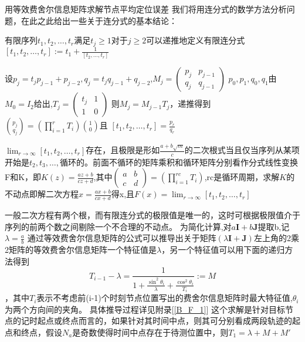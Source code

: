 {用等效费舍尔信息矩阵求解节点平均定位误差}
我们将用连分式的数学方法分析问题，在此之此给出一些关于连分式的基本结论\cite{ContinuedFraction}：
\begin{definition}
  有限序列$t_1,t_2,\dots,t_r$满足$t_j\geq 1$对于$j\geq2$可以递推地定义有限连分式$[t_1,t_2,\dots,t_r]:=t_1+\frac{1}{[t_2,\dots,t_r]}$
\end{definition}
\begin{theorem}\label{thm:basic}
  设$p_j=t_j p_{j-1}+p_{j-2},q_j=t_j q_{j-1}+q_{j-2}$,$M_j=(\begin{matrix}p_j&p_{j-1}\\q_j&q_{j-1}\end{matrix})$
  $p_0,p_1,q_0,q_1$由$M_0=I_2$给出,$T_j=(\begin{matrix}t_j&1\\1&0\end{matrix})$
  则$M_j=M_{j-1}T_j$，递推得到$\binom{p_j}{q_j}=(\prod_{i=1}^r T_i )\binom{1}{0}$且
  $[t_1,t_2,\dots,t_r]=\frac{p_r}{q_r}$
\end{theorem}
\begin{theorem}
$\lim_{r\to \infty}[t_1,t_2,\dots,t_r]$存在，且极限是形如$\frac{a+b\sqrt{m}}{c}$的二次根式当且仅当序列从某项开始是$t_2,t_3,\dots,$循环的。前面不循环的矩阵乘积和循环矩阵分别看作分式线性变换F和K，即$K(z)=\frac{az+b}{cz+d}$,其中$(\begin{matrix}a&b\\c&d\end{matrix})=(\prod_{i=1}^{rc} T_i)$,rc是循环周期，求解$K$的不动点即解二次方程$x=\frac{ax+b}{cx+d}$得x,且$F(x)=\lim_{r\to \infty}[t_1,t_2,\dots,t_r]$
\end{theorem}
一般二次方程有两个根，而有限连分式的极限值是唯一的，这时可根据极限值介于序列的前两个数之间剔除一个不合理的不动点。
为简化计算,对$a\bm{I}+b\bm{J}$提取b,记$\lambda=\frac{a}{b}$
通过等效费舍尔信息矩阵的公式可以推导出关于矩阵$(\lambda\bm{I}+\bm{J})$左上角的2乘2矩阵的等效费舍尔信息矩阵一个特征值是$\lambda$，另一个特征值可以用下面的递归方法得到
\begin{equation}\label{eq:recursive_efim}
T_{i-1}-\lambda=\frac{1}{1+\frac{\sin^2\theta_i}{\lambda}+\frac{\cos^2\theta_i}{T_i}}:=M
\end{equation}
，其中$T_i$表示不考虑前(i-1)个时刻节点位置写出的费舍尔信息矩阵时最大特征值,$\theta_i$为两个方向间的夹角。
具体推导过程详见附录[\ref{B_F_1}]
这个求解是针对目标节点的记时起点或终点而言的，如果针对其时间中点，则其可分别看成两段轨迹的起点和终点，假设$N_a$是奇数使得时间中点存在于待测位置中，则$T_1=\lambda+M+M'$
